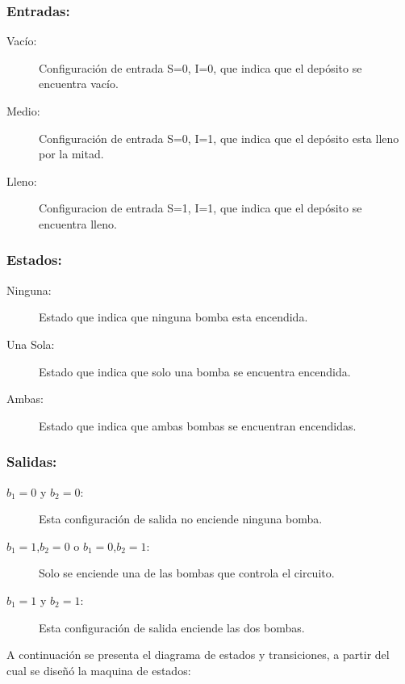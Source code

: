 \documentclass[10pt,a4paper]{article}
\begin{document}
\subsubsection*{Entradas:}

\begin{description}
\item[Vacío:] Configuración de entrada S=0, I=0, que indica que el depósito se encuentra vacío.
\item[Medio:] Configuración de entrada S=0, I=1, que indica que el depósito esta lleno por la mitad.
\item[Lleno:] Configuracion de entrada S=1, I=1, que indica que el depósito se encuentra lleno.
\end{description}

\subsubsection*{Estados:}

\begin{description}
\item[Ninguna:] Estado que indica que ninguna bomba esta encendida.
\item[Una Sola:] Estado que indica que solo una bomba se encuentra encendida.
\item[Ambas:] Estado que indica que ambas bombas se encuentran encendidas.
\end{description}

\subsubsection*{Salidas:}

\begin{description}
\item[$b_1=0$ y $b_2=0$:] Esta configuración de salida no enciende ninguna bomba.
\item[$b_1=1$,$b_2=0$ o $b_1=0$,$b_2=1$:] Solo se enciende una de las bombas que controla el circuito.
\item[$b_1=1$ y $b_2=1$:] Esta configuración de salida enciende las dos bombas.
\end{description}

A continuación se presenta el diagrama de estados y transiciones, a partir del cual se diseñó la maquina de estados:
\end{document}
